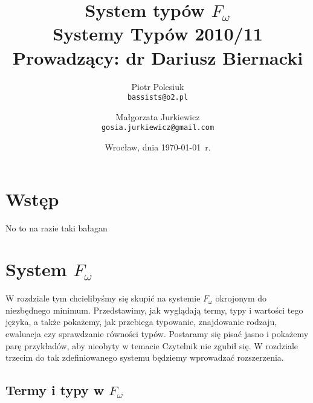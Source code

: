 \documentclass[11pt,leqno]{article}
\title{{\textbf{System typów $F_{\omega}$}}\\[1ex]
       {\Large Systemy Typów 2010/11}\\[-1ex]
       {\large Prowadzący: dr Dariusz Biernacki}}
\author{Piotr Polesiuk \\ \texttt{bassists@o2.pl} 
   \and Małgorzata Jurkiewicz \\ \texttt{gosia.jurkiewicz@gmail.com}}
\date{Wrocław, dnia \today\ r.}
\begin{document}
\thispagestyle{empty}
\maketitle

\pagebreak

\theoremstyle{plain}
\newtheorem{twierdzenie}{Twierdzenie}
\newtheorem{lemay}{Lemat}

\theoremstyle{definition}
\newtheorem{definicja}{Definicja}

\section{Wstęp}
\setcounter{equation}{0}


No to na razie taki bałagan



\section{System $F_{\omega}$}                                 
\setcounter{equation}{0}

W rozdziale tym chcielibyśmy się skupić na systemie $F_{\omega}$ okrojonym do niezbędnego minimum.
Przedstawimy, jak wyglądają termy, typy i wartości tego języka, a także pokażemy, jak przebiega typowanie,
znajdowanie rodzaju, ewaluacja czy sprawdzanie równości typów. Postaramy się pisać jasno i pokażemy parę przykładów, 
aby nieobyty w temacie Czytelnik nie zgubił się.  W rozdziale trzecim do tak zdefiniowanego systemu będziemy wprowadzać
rozszerzenia.

\subsection {Termy i typy w $F_\omega$}
\end{document}

